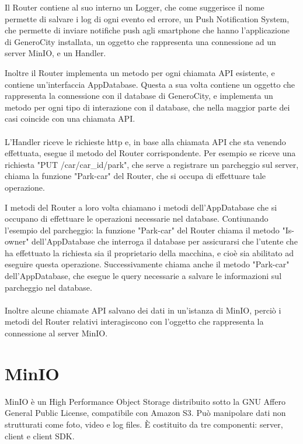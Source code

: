 \documentclass[italian, oneside]{sapthesis} %
\begin{document}
	Il Router contiene al suo interno un Logger, che come suggerisce il nome permette di salvare i log di ogni evento ed errore, un Push Notification System, che permette di inviare notifiche push agli smartphone che hanno l'applicazione di GeneroCity installata, un oggetto che rappresenta una connessione ad un server MinIO, e un Handler.

	Inoltre il Router implementa un metodo per ogni chiamata API esistente, e contiene un'interfaccia AppDatabase. Questa a sua volta contiene un oggetto che rappresenta la connessione con il database di GeneroCity, e implementa un metodo per ogni tipo di interazione con il database, che nella maggior parte dei casi coincide con una chiamata API.

	\paragraph*{}
	L'Handler riceve le richieste http e, in base alla chiamata API che sta venendo effettuata, esegue il metodo del Router corrispondente. Per esempio se riceve una richiesta "PUT /car/{car\_id}/park", che serve a registrare un parcheggio sul server, chiama la funzione "Park-car" del Router, che si occupa di effettuare tale operazione.

	I metodi del Router a loro volta chiamano i metodi dell'AppDatabase che si occupano di effettuare le operazioni necessarie nel database. Contiunando l'esempio del parcheggio: la funzione "Park-car" del Router chiama il metodo "Is-owner" dell'AppDatabase che interroga il database per assicurarsi che l'utente che ha effettuato la richiesta sia il proprietario della macchina, e cio\`e sia abilitato ad eseguire questa operazione. Successivamente chiama anche il metodo "Park-car" dell'AppDatabase, che esegue le query necessarie a salvare le informazioni sul parcheggio nel database.
	
	\paragraph*{}
	Inoltre alcune chiamate API salvano dei dati in un'istanza di MinIO, perci\`o i metodi del Router relativi interagiscono con l'oggetto che rappresenta la connessione al server MinIO.

	\section*{MinIO}
	MinIO \`e un High Performance Object Storage distribuito sotto la GNU Affero General Public License, compatibile con Amazon S3. Pu\`o manipolare dati non strutturati come foto, video e log files\cite{ref:minio}. \`E costituito da tre componenti: server, client e client SDK.
	
\end{document}
